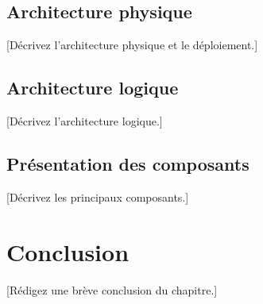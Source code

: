\subsection{Architecture physique}
[Décrivez l'architecture physique et le déploiement.]

\subsection{Architecture logique}
[Décrivez l'architecture logique.]

\subsection{Présentation des composants}
[Décrivez les principaux composants.]

\section{Conclusion}
[Rédigez une brève conclusion du chapitre.]
